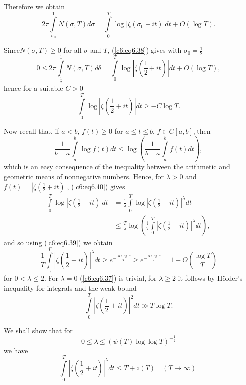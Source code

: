 Therefore we obtain
\begin{equation}
2 \pi \int\limits^{1}_{\sigma_0} N(\sigma, T) d \sigma = \int\limits^T_0 \log |\zeta(\sigma_0 + it)|dt + O(\log T).\label{c6:eq6.38}
\end{equation}

Since\pageoriginale $N (\sigma, T) \geq 0$ for all $\sigma$ and $T$,
(\ref{c6:eq6.38}) gives with $\sigma_0 = \frac{1}{2}$ 
$$
0 \leq 2 \pi \int\limits^1_{\frac{1}{2}} N(\sigma, T) d \delta =
\int\limits^T_0 \log \left|\zeta\left(\frac{1}{2} + it\right)\right|dt
+ O(\log T),  
$$
hence for a suitable $C > 0$
\begin{equation}
\int\limits^T_0 \log \left|\zeta \left(\frac{1}{2} + it \right)\right|
dt \geq - C\log T.\label{c6:eq6.39} 
\end{equation}

Now recall that, if $a < b$, $f(t) \geq 0$ for $a \leq t \leq b$, $f
\in C [a,b]$, then  
\begin{equation}
\frac{1}{b-a} \int\limits^b_a \log f(t) dt \leq \log
\left(\frac{1}{b-a} \int\limits^b_a f(t) dt
\right),\label{c6:eq6.40} 
\end{equation}
which is an easy consequence of the inequality between the arithmetic
and geometric means of nonnegative numbers. Hence, for $\lambda > 0$
and $f(t) = |\zeta(\frac{1}{2} + it)|$, (\ref{c6:eq6.40}) gives 
\begin{align*}
\int\limits^T_0 \log \left|\zeta \left(\frac{1}{2} + it \right)\right|
dt &= \frac{1}{\lambda} \int\limits^T_0 \log \left|\zeta
\left(\frac{1}{2} + it \right)\right|^{\lambda} dt\\
&\leq \frac{T}{\lambda} \log \left(\frac{1}{T}
\int\limits^T_0 \left|\zeta \left(\frac{1}{2} + it
\right)\right|^\lambda dt \right), 
\end{align*}
and so using (\ref{c6:eq6.39}) we obtain
$$
\frac{1}{T} \int\limits^T_0 \left|\zeta \left(\frac{1}{2} + it
\right)\right|^{\lambda} dt \geq e^{-\frac{\lambda C \log T}{T}} \geq 
e^{-\frac{2C\log T}{T}} = 1 + O \left(\frac{\log T}{T} \right) 
$$
for $0 < \lambda \leq 2$. For $\lambda = 0$ (\ref{c6:eq6.37}) is
trivial, for $\lambda \geq 2$ it follows by H\"older's inequality for
integrals and the weak bound 
$$
\int\limits^{T}_0 \left|\zeta \left(\frac{1}{2} + it \right)\right|^2
dt \gg T \log T. 
$$

\medskip
{} We shall show
that for  
$$
0 \leq \lambda \leq (\psi (T) \log \log T)^{-\frac{1}{2}}
$$
we have
\begin{equation}
\int\limits^T_0 \left|\zeta \left(\frac{1}{2} + it
\right)\right|^\lambda dt \leq T + \circ (T) \quad (T \to
\infty). \label{c6:eq6.41} 
\end{equation}

